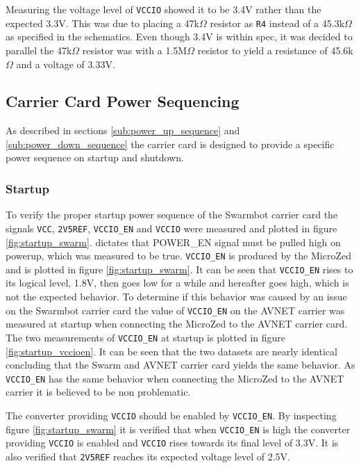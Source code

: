 Measuring the voltage level of \texttt{VCCIO} showed it to be 3.4V rather than the expected 3.3V.
This was due to placing a 47k$\Omega$ resistor as \texttt{R4} instead of a 45.3k$\Omega$ as specified in the schematics.
Even though 3.4V is within spec, it was decided to parallel the 47k$\Omega$ resistor was with a 1.5M$\Omega$ resistor to yield a resistance of 45.6k$\Omega$ and a voltage of 3.33V.

\subsection{Carrier Card Power Sequencing}
As described in sections \ref{sub:power_up_sequence} and \ref{sub:power_down_sequence} the carrier card is designed to provide a specific power sequence on startup and shutdown.

\subsubsection*{Startup}
To verify the proper startup power sequence of the Swarmbot carrier card the signals \texttt{VCC}, \texttt{2V5REF}, \texttt{VCCIO\_EN} and \texttt{VCCIO} were measured and plotted in figure \ref{fig:startup_swarm}.
\cite{design_carrier} dictates that POWER\_EN signal must be pulled high on powerup, which was measured to be true.
\texttt{VCCIO\_EN} is produced by the MicroZed and is plotted in figure \ref{fig:startup_swarm}. 
It can be seen that \texttt{VCCIO\_EN} rises to its logical level, 1.8V, then goes low for a while and hereafter goes high, which is not the expected behavior.
To determine if this behavior was caused by an issue on the Swarmbot carrier card the value of \texttt{VCCIO\_EN} on the AVNET carrier was measured at startup when connecting the MicroZed to the AVNET carrier card.
The two measurements of \texttt{VCCIO\_EN} at startup is plotted in figure \ref{fig:startup_vccioen}.
It can be seen that the two datasets are nearly identical concluding that the Swarm and AVNET carrier card yields the same behavior.
As \texttt{VCCIO\_EN} has the same behavior when connecting the MicroZed to the AVNET carrier it is believed to be non problematic.

The converter providing \texttt{VCCIO} should be enabled by \texttt{VCCIO\_EN}.
By inspecting figure \ref{fig:startup_swarm} it is verified that when \texttt{VCCIO\_EN} is high the converter providing \texttt{VCCIO} is enabled and  \texttt{VCCIO} rises towards its final level of 3.3V.
It is also verified that \texttt{2V5REF} reaches its expected voltage level of 2.5V.

